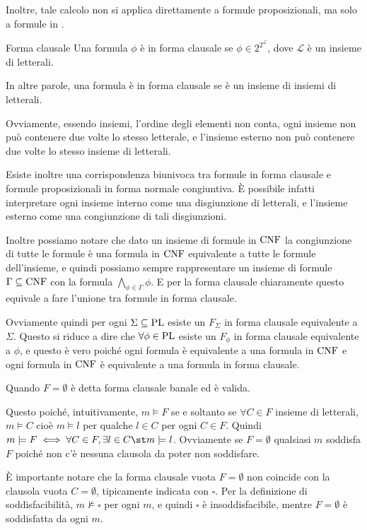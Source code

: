 Inoltre, tale calcolo non si applica direttamente a formule proposizionali, ma solo a formule in .

\begin{definition}{Forma clausale}
  Una formula \(\phi\) è in forma clausale se \(\phi \in 2^{2^\mathcal{L}}\), dove \(\mathcal{L}\) è un insieme di letterali.

  In altre parole, una formula è in forma clausale se è un insieme di insiemi di letterali.
\end{definition}

Ovviamente, essendo insiemi, l'ordine degli elementi non conta, ogni insieme  non può contenere due volte lo stesso letterale, e l'insieme esterno non può contenere due volte lo stesso insieme di letterali.

Esiste inoltre una corrispondenza biunivoca tra formule in forma clausale e formule proposizionali in forma normale congiuntiva.
È possibile infatti interpretare ogni insieme interno come una disgiunzione di letterali, e l'insieme esterno come una congiunzione di tali disgiunzioni.

Inoltre possiamo notare che dato un insieme di formule in \(\operatorname{CNF}\) la congiunzione di tutte le formule è una formula in \(\operatorname{CNF}\) equivalente a tutte le formule dell'insieme, e quindi possiamo sempre rappresentare un insieme di formule \(\Gamma\subseteq\operatorname{CNF}\) con la formula \(\bigwedge_{\phi\in\Gamma}\phi\). E per la forma clausale chiaramente questo equivale a fare l'unione tra formule in forma clausale.

Ovviamente quindi per ogni \(\Sigma\subseteq\operatorname{PL}\) esiste un \(F_\Sigma\) in forma clausale equivalente a \(\Sigma\).
Questo si riduce a dire che \(\forall\phi\in\operatorname{PL}\) esiste un \(F_\phi\) in forma clausale equivalente a \(\phi\), e questo è vero poiché ogni formula è equivalente a una formula in \(\operatorname{CNF}\) e ogni formula in \(\operatorname{CNF}\) è equivalente a una formula in forma clausale.

Quando \(F = \emptyset\) è detta forma clausale banale ed è valida.

Questo poiché, intuitivamente, \(m\models F\) se e soltanto se \(\forall C \in F\) insieme di letterali, \(m\models C\) cioè \(m\models l\) per qualche \(l \in C\) per ogni \(C\in F\).
Quindi \(m\models F \iff \forall C \in F ,\exists l \in C\st m\models l\). Ovviamente se \(F =\emptyset\) qualsiasi \(m\) soddisfa \(F\) poiché non c'è nessuna clausola da poter non soddisfare.


È importante notare che la forma clausale vuota \(F=\emptyset\) non coincide con la clausola vuota \(C=\emptyset\), tipicamente indicata con \(\square\). Per la definizione di soddisfacibilità, \(m\not\models \square\) per ogni \(m\), e quindi \(\square\) è insoddisfacibile, mentre \(F=\emptyset\) è soddisfatta da ogni \(m\).

